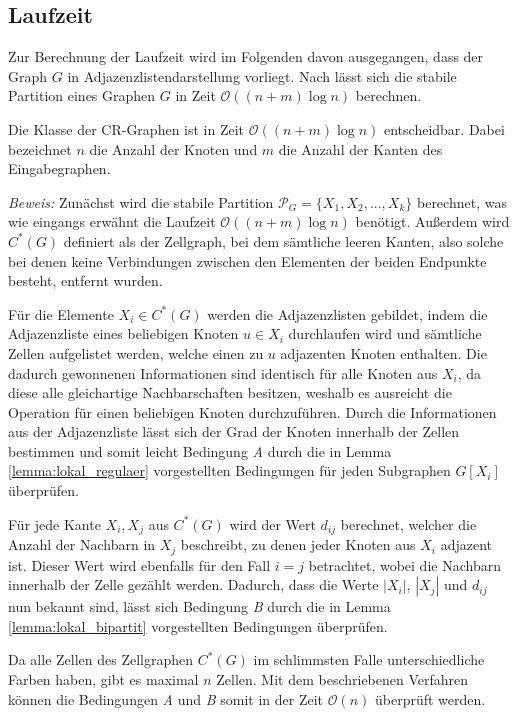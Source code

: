 \subsection{Laufzeit}
Zur Berechnung der Laufzeit wird im Folgenden davon ausgegangen, dass der Graph $G$ in Adjazenzlistendarstellung vorliegt.
Nach \cite{CARDON198285} lässt sich die stabile Partition eines Graphen $G$ in Zeit $\mathcal{O}((n+m)\log n)$ berechnen.

\begin{Theorem}
	Die Klasse der CR-Graphen ist in Zeit $\mathcal{O}((n+m)\log n)$ entscheidbar. Dabei bezeichnet $n$ die Anzahl der Knoten und $m$ die Anzahl der Kanten des Eingabegraphen.
\end{Theorem}

\emph{Beweis:} Zunächst wird die stabile Partition $\mathcal{P}_G=\{X_1,X_2,...,X_k\}$ berechnet, was wie eingangs erwähnt die Laufzeit $\mathcal{O}((n+m)\log n)$ benötigt.
Außerdem wird $C^*(G)$ definiert als der Zellgraph, bei dem sämtliche leeren Kanten, also solche bei denen keine Verbindungen zwischen den Elementen der beiden Endpunkte besteht, entfernt wurden.

Für die Elemente $X_i\in C^*(G)$ werden die Adjazenzlisten gebildet, indem die Adjazenzliste eines beliebigen Knoten $u\in X_i$ durchlaufen wird und sämtliche Zellen aufgelistet werden, welche einen zu $u$ adjazenten Knoten enthalten.
Die dadurch gewonnenen Informationen sind identisch für alle Knoten aus $X_i$, da diese alle gleichartige Nachbarschaften besitzen, weshalb es ausreicht die Operation für einen beliebigen Knoten durchzuführen.
Durch die Informationen aus der Adjazenzliste lässt sich der Grad der Knoten innerhalb der Zellen bestimmen und somit leicht Bedingung \emph{A} durch die in Lemma \ref{lemma:lokal_regulaer} vorgestellten Bedingungen für jeden Subgraphen $G[X_i]$ überprüfen.

Für jede Kante ${X_i,X_j}$ aus $C^*(G)$ wird der Wert $d_{ij}$ berechnet, welcher die Anzahl der Nachbarn in $X_j$ beschreibt, zu denen jeder Knoten aus $X_i$ adjazent ist.
Dieser Wert wird ebenfalls für den Fall $i=j$ betrachtet, wobei die Nachbarn innerhalb der Zelle gezählt werden.
Dadurch, dass die Werte $|X_i|$, $|X_j|$ und $d_{ij}$ nun bekannt sind, lässt sich Bedingung \emph{B} durch die in Lemma \ref{lemma:lokal_bipartit} vorgestellten Bedingungen überprüfen.

Da alle Zellen des Zellgraphen $C^*(G)$ im schlimmsten Falle unterschiedliche Farben haben, gibt es maximal $n$ Zellen.
Mit dem beschriebenen Verfahren können die Bedingungen \emph{A} und \emph{B} somit in der Zeit $\mathcal{O}(n)$ überprüft werden.

